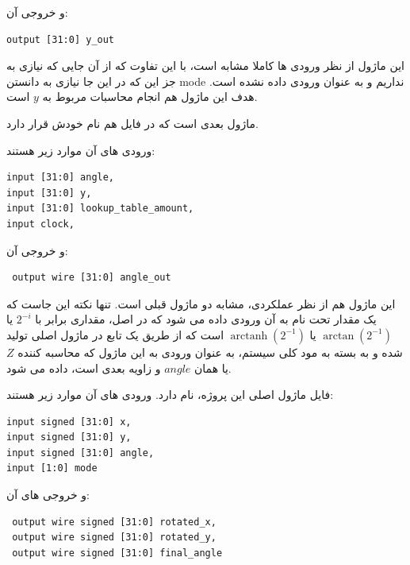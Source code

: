 \documentclass[12pt,titlepage,a4page , tikz , multi,table , svgnames,xcdraw]{article}
\DeclareMathOperator\arctanh{arctanh}
\begin{document}
و خروجی آن:

\begin{latin}
\begin{verbatim}
output [31:0] y_out
\end{verbatim}
\end{latin}

این ماژول از نظر ورودی ها کاملا مشابه  است، با این تفاوت که از آن جایی که نیازی به جز این که در این جا نیازی به دانستن mode نداریم و به عنوان ورودی داده نشده است. هدف این ماژول هم انجام محاسبات مربوط به $y$ است.

\hrulefill


ماژول بعدی  است که در فایل هم نام خودش قرار دارد.

 
 ورودی های آن موارد زیر هستند:

\begin{latin}
\begin{verbatim}
input [31:0] angle,
input [31:0] y,
input [31:0] lookup_table_amount,
input clock,
\end{verbatim}
\end{latin}

و خروجی آن:

\begin{latin}
\begin{verbatim}
 output wire [31:0] angle_out
\end{verbatim}
\end{latin}

این ماژول هم از نظر عملکردی، مشابه دو ماژول قبلی است. تنها نکته این جاست که یک مقدار تحت نام  به آن ورودی داده می شود که در اصل، مقداری برابر با $2^{-i}$ یا $\arctan (2^{-1})$ یا
$\arctanh (2^{-1})$
است که از طریق یک تابع در ماژول اصلی تولید شده و به بسته به مود کلی سیستم، به عنوان ورودی به این ماژول که محاسبه کننده $Z$ یا همان $angle$ و زاویه بعدی است، داده می شود.

\hrulefill

فایل ماژول اصلی این پروژه،  نام دارد. ورودی های آن موارد زیر هستند:

\begin{latin}
\begin{verbatim}
input signed [31:0] x,
input signed [31:0] y,
input signed [31:0] angle,
input [1:0] mode
\end{verbatim}
\end{latin}

و خروجی های آن:

\begin{latin}
\begin{verbatim}
 output wire signed [31:0] rotated_x,
 output wire signed [31:0] rotated_y,
 output wire signed [31:0] final_angle
\end{verbatim}
\end{latin}
\end{document}
